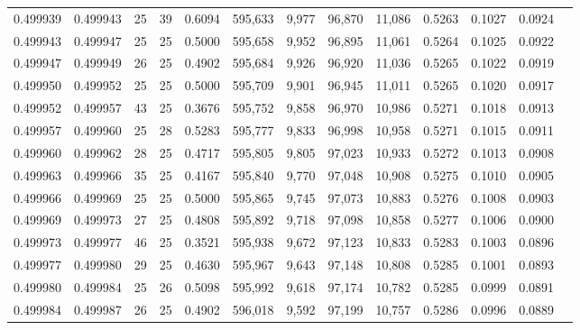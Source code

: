 \begin{tabular}{rrrrrrrrrrrrr}
0.499939 & 0.499943 &    25 &  39 &                                     0.6094 & 595,633 &   9,977 &  96,870 &  11,086 & 0.5263 & 0.1027 & 0.0924 \\
0.499943 & 0.499947 &    25 &  25 &                                     0.5000 & 595,658 &   9,952 &  96,895 &  11,061 & 0.5264 & 0.1025 & 0.0922 \\
0.499947 & 0.499949 &    26 &  25 &                                     0.4902 & 595,684 &   9,926 &  96,920 &  11,036 & 0.5265 & 0.1022 & 0.0919 \\
0.499950 & 0.499952 &    25 &  25 &                                     0.5000 & 595,709 &   9,901 &  96,945 &  11,011 & 0.5265 & 0.1020 & 0.0917 \\
0.499952 & 0.499957 &    43 &  25 &                                     0.3676 & 595,752 &   9,858 &  96,970 &  10,986 & 0.5271 & 0.1018 & 0.0913 \\
0.499957 & 0.499960 &    25 &  28 &                                     0.5283 & 595,777 &   9,833 &  96,998 &  10,958 & 0.5271 & 0.1015 & 0.0911 \\
0.499960 & 0.499962 &    28 &  25 &                                     0.4717 & 595,805 &   9,805 &  97,023 &  10,933 & 0.5272 & 0.1013 & 0.0908 \\
0.499963 & 0.499966 &    35 &  25 &                                     0.4167 & 595,840 &   9,770 &  97,048 &  10,908 & 0.5275 & 0.1010 & 0.0905 \\
0.499966 & 0.499969 &    25 &  25 &                                     0.5000 & 595,865 &   9,745 &  97,073 &  10,883 & 0.5276 & 0.1008 & 0.0903 \\
0.499969 & 0.499973 &    27 &  25 &                                     0.4808 & 595,892 &   9,718 &  97,098 &  10,858 & 0.5277 & 0.1006 & 0.0900 \\
0.499973 & 0.499977 &    46 &  25 &                                     0.3521 & 595,938 &   9,672 &  97,123 &  10,833 & 0.5283 & 0.1003 & 0.0896 \\
0.499977 & 0.499980 &    29 &  25 &                                     0.4630 & 595,967 &   9,643 &  97,148 &  10,808 & 0.5285 & 0.1001 & 0.0893 \\
0.499980 & 0.499984 &    25 &  26 &                                     0.5098 & 595,992 &   9,618 &  97,174 &  10,782 & 0.5285 & 0.0999 & 0.0891 \\
0.499984 & 0.499987 &    26 &  25 &                                     0.4902 & 596,018 &   9,592 &  97,199 &  10,757 & 0.5286 & 0.0996 & 0.0889 \\

\end{tabular}

